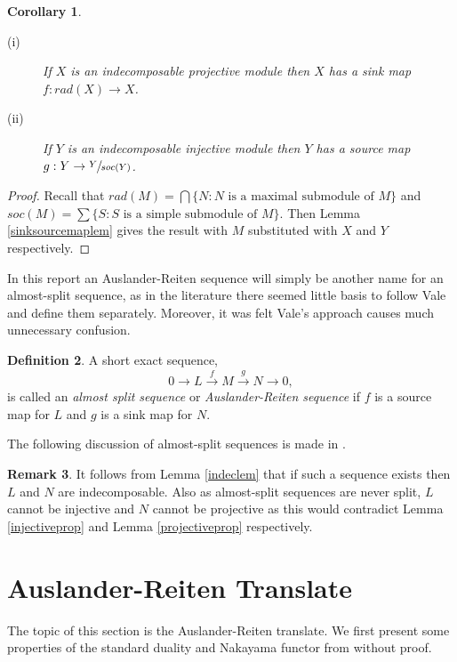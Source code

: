 \documentclass[11.5pt, twoside, a4paper, titlepage]{report}
\theoremstyle{definition}
\newtheorem{mydef}{Definition}[section]
\newtheorem{rem}[mydef]{Remark}
\theoremstyle{plain}
\newtheorem{cor}[mydef]{Corollary}
\begin{document}
\begin{cor}
\begin{description}
\item [(i)] If $X$ is an indecomposable projective module then $X$ has a sink map $f: rad(X) \to X$.
\item [(ii)] If $Y$ is an indecomposable injective module then $Y$ has a source map $g: Y \to \sfrac{Y}{soc(Y)}$.
\end{description}
\end{cor}
\begin{proof}
Recall that $rad(M)=\bigcap \{N: N\text{ is a maximal submodule of }M\}$ and $soc(M)=\sum \{S: S\text{ is a simple submodule of }M\}$. Then Lemma \ref{sinksourcemaplem} gives the result with $M$ substituted with $X$ and $Y$ respectively.
\end{proof}

In this report an Auslander-Reiten sequence will simply be another name for an almost-split sequence, as in the literature there seemed little basis to follow Vale and define them separately. Moreover, it was felt Vale's approach causes much unnecessary confusion.

\begin{mydef}
A short exact sequence,
\begin{equation*}
0 \xrightarrow{} L \xrightarrow{f} M \xrightarrow{g} N \xrightarrow{} 0,
\end{equation*}
is called an \emph{almost split sequence} or \emph{Auslander-Reiten sequence} if $f$ is a source map for $L$ and $g$ is a sink map for $N$.
\end{mydef}

The following discussion of almost-split sequences is made in \cite{Assem}.
\begin{rem}
It follows from Lemma \ref{indeclem} that if such a sequence exists then $L$ and $N$ are indecomposable. Also as almost-split sequences are never split, $L$ cannot be injective and $N$ cannot be projective as this would contradict Lemma \ref{injectiveprop} and Lemma \ref{projectiveprop} respectively.
\end{rem}

\section{Auslander-Reiten Translate}
The topic of this section is the Auslander-Reiten translate. We first present some properties of the standard duality and Nakayama functor from \cite{CB2} without proof.
\end{document}
